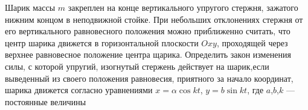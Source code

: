 Шарик массы $m$ закреплен на конце вертикального упругого стержня,
зажатого нижним концом в неподвижной стойке.
При небольших отклонениях стержня от его вертикального
равновесного положения можно приближенно считать, что центр
шарика движется в горизонтальной плоскости $Oxy$, проходящей через
верхнее равновесное положение центра щарика.
Определить закон изменения силы, с которой упругий, изогнутый стержень
действует на шарик,если выведенный из своего положения равновесия, 
приятного за начало координат, шарика движется согласно уравнениями
$x=\alpha\cos kt$, $y=b\sin kt$, где $a$,$b$,$k$ --- постоянные величины
